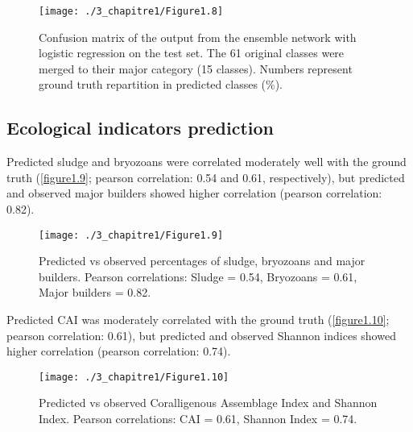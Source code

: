 \begin{figure}[H]
	\begin{center}
	\texttt{[image: ./3\_chapitre1/Figure1.8]}
		\caption[Confusion matrix of the output from the ensemble network with logistic regression on the test set]{Confusion matrix of the output from the ensemble network with logistic regression on the test set. The 61 original classes were merged to their major category (15 classes). Numbers represent ground truth repartition in predicted classes (\%).}
	\label{figure1.8}
\end{center}
\end{figure}

\newpage

\subsection{Ecological indicators prediction}\label{chapitre1_6.4}
Predicted sludge and bryozoans were correlated moderately well with the ground truth (\autoref{figure1.9}; pearson correlation: 0.54 and 0.61, respectively), but predicted and observed major builders showed higher correlation (pearson correlation: 0.82).

\begin{figure}[H]
	\begin{center}
	\texttt{[image: ./3\_chapitre1/Figure1.9]}
		\caption[Predicted vs observed percentages of sludge, bryozoans and major builders]{Predicted vs observed percentages of sludge, bryozoans and major builders. Pearson correlations: Sludge = 0.54, Bryozoans = 0.61, Major builders = 0.82.}
	\label{figure1.9}
\end{center}
\end{figure}

Predicted CAI was moderately correlated with the ground truth (\autoref{figure1.10}; pearson correlation: 0.61), but predicted and observed Shannon indices showed higher correlation (pearson correlation: 0.74).

\begin{figure}[H]
	\begin{center}
	\texttt{[image: ./3\_chapitre1/Figure1.10]}
		\caption[Predicted vs observed Coralligenous Assemblage Index and Shannon Index]{Predicted vs observed Coralligenous Assemblage Index and Shannon Index. Pearson correlations: CAI = 0.61, Shannon Index = 0.74.}
	\label{figure1.10}
\end{center}
\end{figure}

